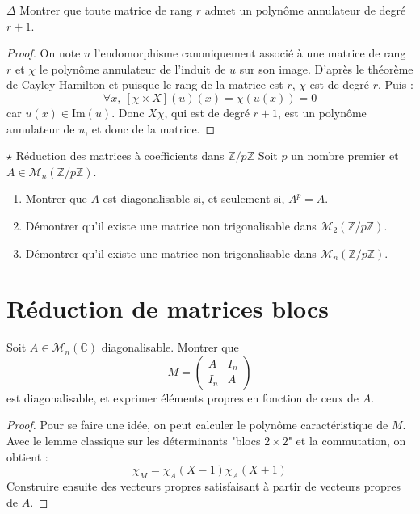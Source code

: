\documentclass[french,a4paper]{article}
\newcommand{\Z}{\mathbb{Z}}
\newcommand{\C}{\mathbb{C}}
\newcommand{\im}{\text{Im}}
\theoremstyle{plain}
\theoremstyle{definition}
\theoremstyle{remark}
\begin{document}
\begin{ex}{$\Delta$}
	Montrer que toute matrice de rang $r$ admet un polynôme annulateur de degré $r+1$.
\end{ex}
\begin{proof}
	On note $u$ l'endomorphisme canoniquement associé à une matrice de rang $r$ et $\chi$ le polynôme annulateur de l'induit de $u$ sur son image. D'après le théorème de Cayley-Hamilton et puisque le rang de la matrice est $r$, $\chi$ est de degré $r$. Puis : $$\forall x,\ \left[\chi \times X\right](u)(x)=\chi(u(x))=0$$ car $u(x)\in\im(u)$. Donc $X\chi$, qui est de degré $r+1$, est un polynôme annulateur de $u$, et donc de la matrice.
\end{proof}

\begin{ex}[Châteaux]{$\star$ Réduction des matrices à coefficients dans $\Z/p\Z$}
	Soit $p$ un nombre premier et $A\in\mathcal{M}_n(\Z/p\Z)$.
	\begin{enumerate}
		\item Montrer que $A$ est diagonalisable si, et seulement si, $A^p=A$.
		\item Démontrer qu'il existe une matrice non trigonalisable dans $\mathcal{M}_2(\Z/p\Z)$.
		\item Démontrer qu'il existe une matrice non trigonalisable dans $\mathcal{M}_n(\Z/p\Z)$.
	\end{enumerate}
\end{ex}

\section{Réduction de matrices blocs}

\begin{ex}{}
	Soit $A\in\mathcal{M}_n(\C)$ diagonalisable. Montrer que $$M=\begin{pmatrix}
		A&I_n\\
		I_n&A
	\end{pmatrix}$$ est diagonalisable, et exprimer éléments propres en fonction de ceux de $A$.
\end{ex}
\begin{proof}
	Pour se faire une idée, on peut calculer le polynôme caractéristique de $M$. Avec le lemme classique sur les déterminants "blocs $2\times2$" et la commutation, on obtient : $$\chi_M=\chi_A(X-1)\chi_A(X+1)$$ Construire ensuite des vecteurs propres satisfaisant à partir de vecteurs propres de $A$.
\end{proof}
\end{document}
